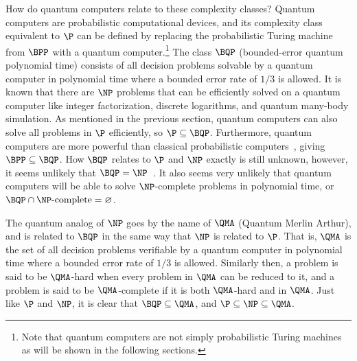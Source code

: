 How do quantum computers relate to these complexity classes?
Quantum computers are probabilistic computational devices, and its complexity class equivalent to $\P$ can be defined by replacing the probabilistic Turing machine from $\BPP$ with a quantum computer.\footnote{Note that quantum computers are not simply probabilistic Turing machines as will be shown in the following sections.}
The class $\BQP$ (bounded-error quantum polynomial time) consists of all decision problems solvable by a quantum computer in polynomial time where a bounded error rate of $1/3$ is allowed.
It is known that there are $\NP$ problems that can be efficiently solved on a quantum computer like integer factorization, discrete logarithms, and quantum many-body simulation.
As mentioned in the previous section, quantum computers can also solve all problems in $\P$ efficiently, so $\P \subseteq \BQP$.
Furthermore, quantum computers are more powerful than classical probabilistic computers~\cite{bernstein1997quantum}, giving $\BPP \subseteq \BQP$.
How $\BQP$ relates to $\P$ and $\NP$ exactly is still unknown, however, it seems unlikely that $\BQP = \NP$~\cite{aaronson2010bqp}.
It also seems very unlikely that quantum computers will be able to solve $\NP$-complete problems in polynomial time, or $\BQP \cap \NP\text{-complete} = \varnothing$.

The quantum analog of $\NP$ goes by the name of $\QMA$ (Quantum Merlin Arthur), and is related to $\BQP$ in the same way that $\NP$ is related to $\P$.
That is, $\QMA$ is the set of all decision problems verifiable by a quantum computer in polynomial time where a bounded error rate of $1/3$ is allowed.
Similarly then, a problem is said to be $\QMA$-hard when every problem in $\QMA$ can be reduced to it, and a problem is said to be $\QMA$-complete if it is both $\QMA$-hard and in $\QMA$.
Just like $\P$ and $\NP$, it is clear that $\BQP \subseteq \QMA$, and $\P \subseteq \NP \subseteq \QMA$.

